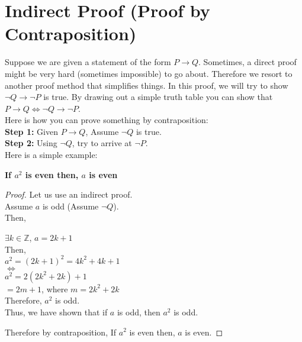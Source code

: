 \section{Indirect Proof (Proof by Contraposition)}
Suppose we are given a statement of the form $P \rightarrow Q$. Sometimes, a
direct proof might be very hard (sometimes impossible) to go about. Therefore
we resort to another proof method that simplifies things. In this proof, we
will try to show $\neg Q \rightarrow \neg P$ is true. By drawing out a simple
truth table you can show that $ P \rightarrow Q \Leftrightarrow \neg Q
\rightarrow \neg P$.\\
\indent Here is how you can prove something by contraposition: \\
\indent \textbf{Step 1:} Given $P \rightarrow Q$, Assume $\neg Q$ is true. \\
\indent \textbf{Step 2:} Using $\neg Q$, try to arrive at $\neg P$. \\
\noindent Here is a simple example:
\begin{center}
    \textbf{If $a^{2}$ is even then, $a$ is even}
\end{center}
\begin{proof}
    Let us use an indirect proof. \\
    Assume $a$ is odd (Assume $\neg Q$). \\
    Then,
    \begin{center}
        $\exists k \in \mathbb{Z}$, $a = 2k + 1$ \\
        Then, \\
        $ a^{2} = (2k + 1)^{2} = 4k^2 + 4k + 1 $ \\
        $\Leftrightarrow$ \\
        $ a^{2} = 2(2k^{2} + 2k) + 1 $ \\
        $ = 2m + 1 $, where $ m = 2k^{2} + 2k $ \\
        Therefore, $a^{2}$ is odd. \\
        Thus, we have shown that if $a$ is odd, then $a^{2}$ is odd.
    \end{center}
    Therefore by contraposition, If $a^{2}$ is even then, $a$ is even.
\end{proof}
